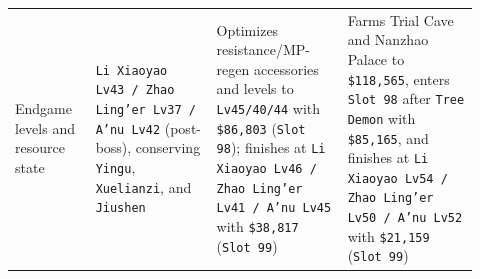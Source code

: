 \documentclass[11pt,a4paper]{article}
\begin{document}
{\begin{longtable}{@{}>{\RaggedRight\arraybackslash}p{0.16\linewidth}>{\RaggedRight\arraybackslash}p{0.24\linewidth}>{\RaggedRight\arraybackslash}p{0.26\linewidth}>{\RaggedRight\arraybackslash}p{0.26\linewidth}@{}}
Endgame levels and resource state & \texttt{Li\allowbreak{} \allowbreak{}Xiaoyao\allowbreak{} \allowbreak{}Lv43\allowbreak{} \allowbreak{}/\allowbreak{} \allowbreak{}Zhao\allowbreak{} \allowbreak{}Ling'er\allowbreak{} \allowbreak{}Lv37\allowbreak{} \allowbreak{}/\allowbreak{} \allowbreak{}A'nu\allowbreak{} \allowbreak{}Lv42} (post-boss), conserving \texttt{Yingu}, \texttt{Xuelianzi}, and \texttt{Jiushen} & Optimizes resistance/MP-regen accessories and levels to \texttt{Lv45\allowbreak{}/\allowbreak{}40\allowbreak{}/\allowbreak{}44} with \texttt{\$86\allowbreak{},\allowbreak{}803} (\texttt{Slot\allowbreak{} \allowbreak{}98}); finishes at \texttt{Li\allowbreak{} \allowbreak{}Xiaoyao\allowbreak{} \allowbreak{}Lv46\allowbreak{} \allowbreak{}/\allowbreak{} \allowbreak{}Zhao\allowbreak{} \allowbreak{}Ling'er\allowbreak{} \allowbreak{}Lv41\allowbreak{} \allowbreak{}/\allowbreak{} \allowbreak{}A'nu\allowbreak{} \allowbreak{}Lv45} with \texttt{\$38\allowbreak{},\allowbreak{}817} (\texttt{Slot\allowbreak{} \allowbreak{}99}) & Farms Trial Cave and Nanzhao Palace to \texttt{\$118\allowbreak{},\allowbreak{}565}, enters \texttt{Slot\allowbreak{} \allowbreak{}98} after \texttt{Tree\allowbreak{} \allowbreak{}Demon} with \texttt{\$85\allowbreak{},\allowbreak{}165}, and finishes at \texttt{Li\allowbreak{} \allowbreak{}Xiaoyao\allowbreak{} \allowbreak{}Lv54\allowbreak{} \allowbreak{}/\allowbreak{} \allowbreak{}Zhao\allowbreak{} \allowbreak{}Ling'er\allowbreak{} \allowbreak{}Lv50\allowbreak{} \allowbreak{}/\allowbreak{} \allowbreak{}A'nu\allowbreak{} \allowbreak{}Lv52} with \texttt{\$21\allowbreak{},\allowbreak{}159} (\texttt{Slot\allowbreak{} \allowbreak{}99}) \\

\end{longtable}}
\end{document}
